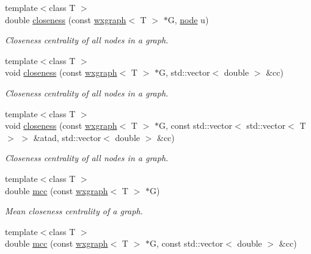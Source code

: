 \begin{DoxyCompactItemize}
{\footnotesize template$<$class T $>$ }\\double \hyperlink{namespacelgraph_1_1networks_1_1metrics_1_1centralities_a641608dcaecba5d3636237bd15da2e96}{closeness} (const \hyperlink{classlgraph_1_1wxgraph}{wxgraph}$<$ T $>$ $\ast$G, \hyperlink{namespacelgraph_a397169dd66adf725210a30fb7251773e}{node} u)
\begin{DoxyCompactList}\small\item\em Closeness centrality of all nodes in a graph. \end{DoxyCompactList}\item 
{\footnotesize template$<$class T $>$ }\\void \hyperlink{namespacelgraph_1_1networks_1_1metrics_1_1centralities_a070b4de5aa7832b07c860e9527ad5526}{closeness} (const \hyperlink{classlgraph_1_1wxgraph}{wxgraph}$<$ T $>$ $\ast$G, std\+::vector$<$ double $>$ \&cc)
\begin{DoxyCompactList}\small\item\em Closeness centrality of all nodes in a graph. \end{DoxyCompactList}\item 
{\footnotesize template$<$class T $>$ }\\void \hyperlink{namespacelgraph_1_1networks_1_1metrics_1_1centralities_a05e8a2bf5c57440c5a1aced933ea13bf}{closeness} (const \hyperlink{classlgraph_1_1wxgraph}{wxgraph}$<$ T $>$ $\ast$G, const std\+::vector$<$ std\+::vector$<$ T $>$ $>$ \&atad, std\+::vector$<$ double $>$ \&cc)
\begin{DoxyCompactList}\small\item\em Closeness centrality of all nodes in a graph. \end{DoxyCompactList}\item 
{\footnotesize template$<$class T $>$ }\\double \hyperlink{namespacelgraph_1_1networks_1_1metrics_1_1centralities_aa2424c079e334ea4f33f878448e5806a}{mcc} (const \hyperlink{classlgraph_1_1wxgraph}{wxgraph}$<$ T $>$ $\ast$G)
\begin{DoxyCompactList}\small\item\em Mean closeness centrality of a graph. \end{DoxyCompactList}\item 
{\footnotesize template$<$class T $>$ }\\double \hyperlink{namespacelgraph_1_1networks_1_1metrics_1_1centralities_af66da53eb48ccb2982bd97246a651f00}{mcc} (const \hyperlink{classlgraph_1_1wxgraph}{wxgraph}$<$ T $>$ $\ast$G, const std\+::vector$<$ double $>$ \&cc)

\end{DoxyCompactItemize}
